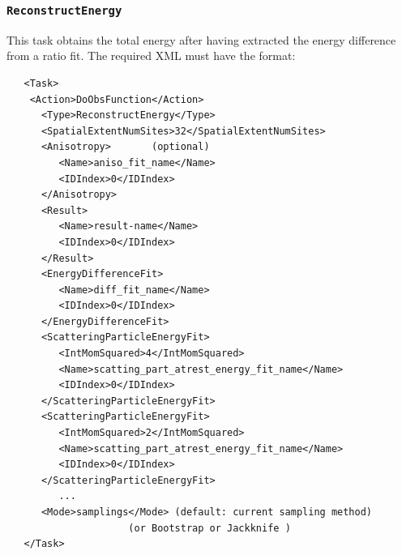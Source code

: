 \documentclass[12pt]{article}
\newcommand{\vb}{\texttt}
\begin{document}
\subsubsection{\vb{ReconstructEnergy}}
This task obtains the total energy after having extracted the energy 
difference from a ratio fit. The
required XML must have the format:
\begin{verbatim}
   <Task>                                                   
    <Action>DoObsFunction</Action>                          
      <Type>ReconstructEnergy</Type>                        
      <SpatialExtentNumSites>32</SpatialExtentNumSites>     
      <Anisotropy>       (optional)                         
         <Name>aniso_fit_name</Name>                        
         <IDIndex>0</IDIndex>                               
      </Anisotropy>                                         
      <Result>                                              
         <Name>result-name</Name>                           
         <IDIndex>0</IDIndex>                               
      </Result>                                             
      <EnergyDifferenceFit>                                 
         <Name>diff_fit_name</Name>                         
         <IDIndex>0</IDIndex>                               
      </EnergyDifferenceFit>                                
      <ScatteringParticleEnergyFit>                         
         <IntMomSquared>4</IntMomSquared>                   
         <Name>scatting_part_atrest_energy_fit_name</Name>  
         <IDIndex>0</IDIndex>                               
      </ScatteringParticleEnergyFit>                        
      <ScatteringParticleEnergyFit>                         
         <IntMomSquared>2</IntMomSquared>                   
         <Name>scatting_part_atrest_energy_fit_name</Name>  
         <IDIndex>0</IDIndex>                               
      </ScatteringParticleEnergyFit>                        
         ...                                                
      <Mode>samplings</Mode> (default: current sampling method)
                     (or Bootstrap or Jackknife )              
   </Task>                                                     
\end{verbatim}
\end{document}
